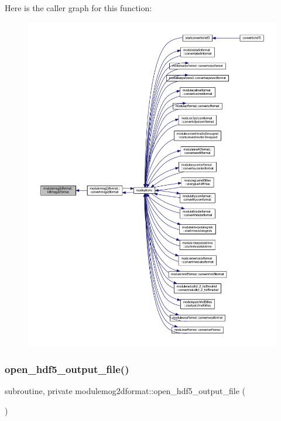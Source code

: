 Here is the caller graph for this function\+:\nopagebreak
\begin{figure}[H]
\begin{center}
\leavevmode
\includegraphics[width=350pt]{namespacemodulemog2dformat_ad23545e02e1d7e1b08d7f23fc6220308_icgraph}
\end{center}
\end{figure}
\mbox{\label{namespacemodulemog2dformat_af04a77a337b8d48c2fd163ae89586914}} 
\subsubsection{\texorpdfstring{open\+\_\+hdf5\+\_\+output\+\_\+file()}{open\_hdf5\_output\_file()}}
{\footnotesize\ttfamily subroutine, private modulemog2dformat\+::open\+\_\+hdf5\+\_\+output\+\_\+file (\begin{DoxyParamCaption}{ }\end{DoxyParamCaption})\hspace{0.3cm}{\ttfamily [private]}}

